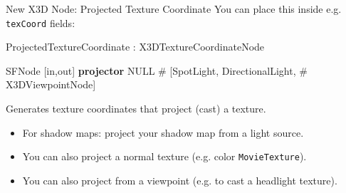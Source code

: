 \documentclass{beamer}
\newcommand*{\codeem}[1]{\textbf{#1}}
\begin{document}
\begin{frame}[fragile]{New X3D Node: Projected Texture Coordinate}
  You can place this inside e.g. \texttt{texCoord} fields:

\begin{block}{ProjectedTextureCoordinate : X3DTextureCoordinateNode}
\begin{semiverbatim}
SFNode  [in,out]  \codeem{projector}  NULL
  \# [SpotLight, DirectionalLight,
  \# X3DViewpointNode]
\end{semiverbatim}
\end{block}

      Generates texture coordinates that project (cast) a texture.
      \begin{itemize}
        \item For shadow maps: project your shadow map from a light source.
        \item You can also project a normal texture (e.g. color \texttt{MovieTexture}).
        \item You can also project from a viewpoint (e.g. to cast a headlight texture).
      \end{itemize}
\end{frame}


\end{document}
